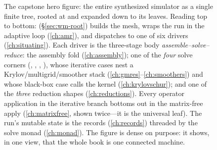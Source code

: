 \begin{figure}[p]
\caption[The whole machine on one page]{The capstone hero figure: the entire
synthesized simulator as a single finite tree, rooted at  and
expanded down to its leaves. Reading top to bottom: 
(\S\ref{sec:wm-root}) builds the mesh, wraps the run in the adaptive
 loop (\cref{ch:amr}), and dispatches to one of six drivers
(\cref{ch:situating}). Each driver is the three-stage body
\emph{assemble--solve--reduce}: the assembly fold 
(\cref{ch:assembly}); one of the \emph{four} solve corners
(, , ,
), whose iterative cases nest a Krylov/multigrid/smoother stack
(\cref{ch:gmres}--\cref{ch:smoothers}) and whose black-box case calls the
 kernel (\cref{ch:krylovschur}); and one of the \emph{three} reduction
shapes (\cref{ch:reductions}). Every operator application in the iterative branch
bottoms out in the matrix-free apply (\cref{ch:matrixfree}, shown twice---it is the
universal leaf). The run's mutable state is the records (\cref{ch:records}) threaded
by the solve monad (\cref{ch:monad}). The figure is dense on purpose: it shows, in
one view, that the whole book is one connected machine.}
\label{fig:wm-hero}
\end{figure}

